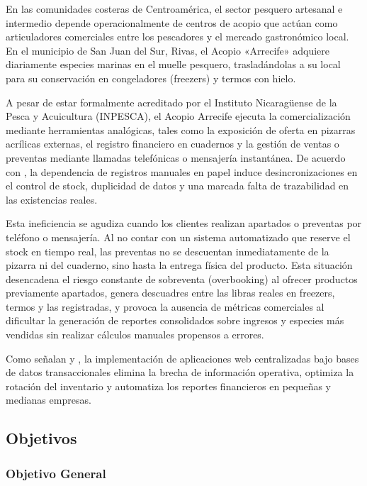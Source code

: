 En las comunidades costeras de Centroamérica, el sector pesquero artesanal e intermedio depende operacionalmente de centros de acopio que actúan como articuladores comerciales entre los pescadores y el mercado gastronómico local. En el municipio de San Juan del Sur, Rivas, el Acopio «Arrecife» adquiere diariamente especies marinas en el muelle pesquero, trasladándolas a su local para su conservación en congeladores (freezers) y termos con hielo.

A pesar de estar formalmente acreditado por el Instituto Nicaragüense de la Pesca y Acuicultura (INPESCA), el Acopio Arrecife ejecuta la comercialización mediante herramientas analógicas, tales como la exposición de oferta en pizarras acrílicas externas, el registro financiero en cuadernos y la gestión de ventas o preventas mediante llamadas telefónicas o mensajería instantánea. De acuerdo con \textcite{ahumada2020sistema}, la dependencia de registros manuales en papel induce desincronizaciones en el control de stock, duplicidad de datos y una marcada falta de trazabilidad en las existencias reales.

Esta ineficiencia se agudiza cuando los clientes realizan apartados o preventas por teléfono o mensajería. Al no contar con un sistema automatizado que reserve el stock en tiempo real, las preventas no se descuentan inmediatamente de la pizarra ni del cuaderno, sino hasta la entrega física del producto. Esta situación desencadena el riesgo constante de sobreventa (overbooking) al ofrecer productos previamente apartados, genera descuadres entre las libras reales en freezers, termos y las registradas, y provoca la ausencia de métricas comerciales al dificultar la generación de reportes consolidados sobre ingresos y especies más vendidas sin realizar cálculos manuales propensos a errores.

Como señalan \textcite{mayorga2024} y \textcite{villasmil2021}, la implementación de aplicaciones web centralizadas bajo bases de datos transaccionales elimina la brecha de información operativa, optimiza la rotación del inventario y automatiza los reportes financieros en pequeñas y medianas empresas.

\subsection{Objetivos}

\subsubsection{Objetivo General}


